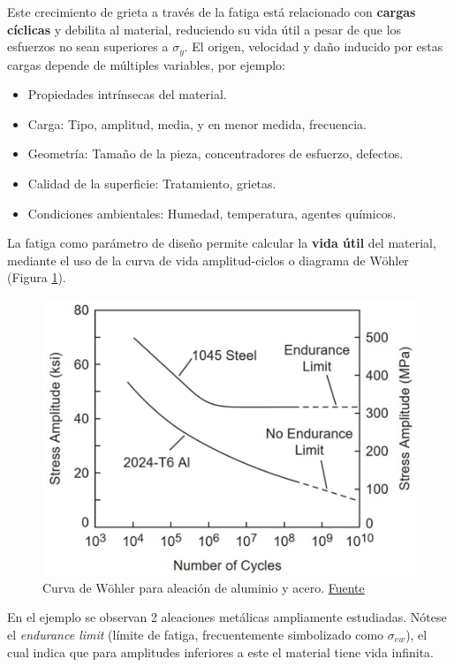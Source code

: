 Este crecimiento de grieta a través de la fatiga está relacionado con \textbf{cargas cíclicas} y debilita al material, reduciendo su vida útil a pesar de que los esfuerzos no sean superiores a $\sigma_{y}$. El origen, velocidad y daño inducido por estas cargas depende de múltiples variables, por ejemplo:

\begin{itemize}
    \item Propiedades intrínsecas del material.
    \item Carga: Tipo, amplitud, media, y en menor medida, frecuencia.
    \item Geometría: Tamaño de la pieza, concentradores de esfuerzo, defectos.
    \item Calidad de la superficie: Tratamiento, grietas.
    \item Condiciones ambientales: Humedad, temperatura, agentes químicos.
\end{itemize}

La fatiga como parámetro de diseño permite calcular la \textbf{vida útil} del material, mediante el uso de la curva de vida amplitud-ciclos o diagrama de Wöhler (Figura \ref{fig:4}).

\begin{figure}[h!]
    \centering
    \includegraphics[width=0.65\linewidth]{imgs/sn.png}
    \caption{Curva de Wöhler para aleación de aluminio y acero.  \href{https://sdcverifier.com/structural-engineering-101/fatigue-strength-and-limit-understanding-materials-specific-data/}{Fuente}}
    \label{fig:4}
\end{figure}

En el ejemplo se observan 2 aleaciones metálicas ampliamente estudiadas. Nótese el \textit{endurance limit} (límite de fatiga, frecuentemente simbolizado como $\sigma_{ew}$), el cual indica que para amplitudes inferiores a este el material tiene vida infinita.

